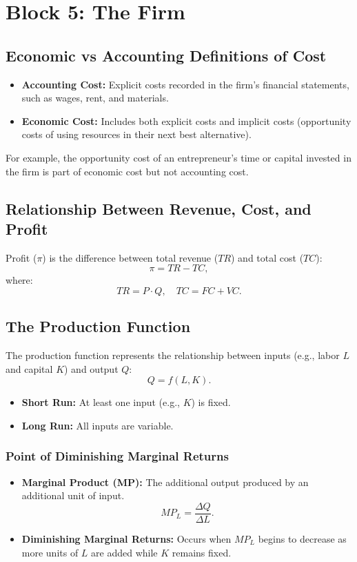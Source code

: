 \chapter*{Block 5: The Firm}

\section*{Economic vs Accounting Definitions of Cost}
\begin{itemize}
    \item \textbf{Accounting Cost:} Explicit costs recorded in the firm’s financial statements, such as wages, rent, and materials.
    \item \textbf{Economic Cost:} Includes both explicit costs and implicit costs (opportunity costs of using resources in their next best alternative).
\end{itemize}
For example, the opportunity cost of an entrepreneur’s time or capital invested in the firm is part of economic cost but not accounting cost.

\section*{Relationship Between Revenue, Cost, and Profit}
Profit (\(\pi\)) is the difference between total revenue (\(TR\)) and total cost (\(TC\)):
\[
\pi = TR - TC,
\]
where:
\[
TR = P \cdot Q, \quad TC = FC + VC.
\]

\section*{The Production Function}
The production function represents the relationship between inputs (e.g., labor \(L\) and capital \(K\)) and output \(Q\):
\[
Q = f(L, K).
\]
\begin{itemize}
    \item \textbf{Short Run:} At least one input (e.g., \(K\)) is fixed.
    \item \textbf{Long Run:} All inputs are variable.
\end{itemize}

\subsection*{Point of Diminishing Marginal Returns}
\begin{itemize}
    \item \textbf{Marginal Product (MP):} The additional output produced by an additional unit of input.
    \[
    MP_L = \frac{\Delta Q}{\Delta L}.
    \]
    \item \textbf{Diminishing Marginal Returns:} Occurs when \(MP_L\) begins to decrease as more units of \(L\) are added while \(K\) remains fixed.
\end{itemize}

